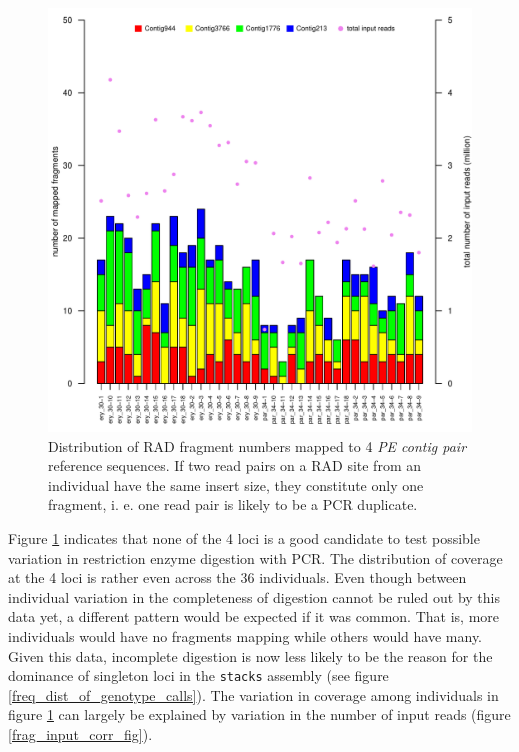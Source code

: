 \documentclass[a4paper,12pt,times,print,index,custombib,custommargin]{PhDThesisPSnPDF}\usepackage[]{graphicx}\usepackage[]{color}
\newenvironment{knitrout}{}{} %
\begin{document}
\begin{figure}
\begin{knitrout}
\color{fgcolor}

{\centering \includegraphics[width=\linewidth]{figure/fragments_mapped_per_ind-1} 

}



\end{knitrout}
\caption{Distribution of RAD \gls{fragment} numbers mapped to 4 \emph{PE contig pair} reference sequences.  
If two read pairs on a RAD site from an individual have the same insert size, they constitute only one fragment, i. e. one read pair is likely to be a PCR duplicate.}
\label{fragments-mapped-per-ind}
\end{figure}

Figure \ref{fragments-mapped-per-ind} indicates that none of the 4 loci is a good candidate to test possible variation in restriction enzyme digestion with PCR. The distribution of coverage at the 4 loci is rather even across the 36 individuals. Even though between individual variation in the completeness of digestion cannot be ruled out by this data yet, a different pattern would be expected if it was common. That is, more individuals would have no fragments mapping while others would have many. Given this data, incomplete digestion is now less likely to be the reason for the dominance of singleton loci in the \texttt{stacks} assembly (see figure \ref{freq_dist_of_genotype_calls}). The variation in coverage among individuals in figure \ref{fragments-mapped-per-ind} can largely be explained by variation in the number of input reads (figure \ref{frag_input_corr_fig}).
\end{document}
